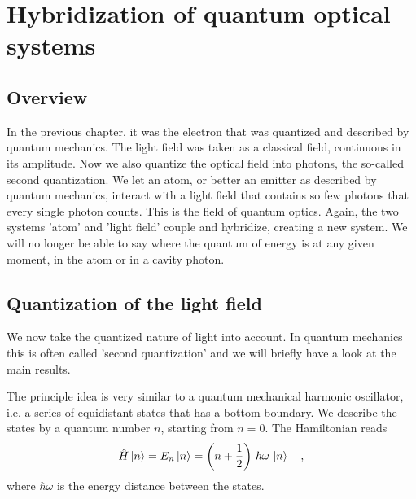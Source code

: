 \renewcommand{\lastmod}{November 28, 2024}
\renewcommand{\chapterauthors}{Markus Lippitz}


\chapter{Hybridization of quantum optical systems}





\section{Overview}

In the previous chapter, it was the electron that was quantized and described by quantum mechanics. The light field was taken as a classical field, continuous in its amplitude. Now we also quantize the optical field into photons, the so-called second quantization. We let an atom, or better an emitter as described by quantum mechanics, interact with a light field that contains so few photons that every single photon counts. This is the field of quantum optics. Again, the two systems 'atom' and 'light field' couple and hybridize, creating a new system. We will no longer be able to say where the quantum of energy is at any given moment, in the atom or in a cavity photon.





\section{Quantization of the light field}
We now  take the quantized nature of light into account. In quantum mechanics this is often called 'second quantization' and we will briefly have a look at the main results.

The principle idea is very similar to a quantum mechanical harmonic oscillator, i.e. a series of equidistant states that has a bottom boundary. We describe the states by a quantum number $n$, starting from $n=0$. The Hamiltonian reads
\begin{equation}
\hat{H} \ket{n} = E_n \ket{n} = \left( n + \frac{1}{2} \right) \, \hbar \omega \, \ket{n} \quad ,
\end{equation}
where $\hbar \omega$ is the energy distance between the states.

